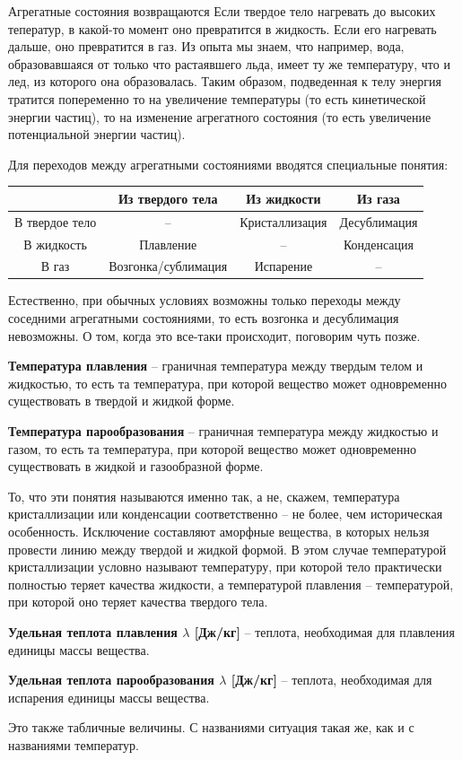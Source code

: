 \documentclass{article}
\newcommand{\definition}[2]{\begin{samepage} \textbf{#1} -- #2. \end{samepage} \par}
\begin{document}
	\begin{section}{Агрегатные состояния возвращаются}
		Если твердое тело нагревать до высоких теператур, в какой-то момент оно превратится в жидкость. Если его нагревать дальше, оно превратится в газ. Из опыта мы знаем, что например, вода, образовавшаяся от только что растаявшего льда, имеет ту же температуру, что и лед, из которого она образовалась. Таким образом, подведенная к телу энергия тратится попеременно то на увеличение температуры (то есть кинетической энергии частиц), то на изменение агрегатного состояния (то есть увеличение потенциальной энергии частиц).

		Для переходов между агрегатными состояниями вводятся специальные понятия:

		\def\arraystretch{2.5}
		\begin{tabular}{c|c|c|c}
			& Из твердого тела & Из жидкости & Из газа \\ \hline
			В твердое тело & -- & Кристаллизация & Десублимация \\
			В жидкость & Плавление & -- & Конденсация \\
			В газ & Возгонка/сублимация & Испарение & --
		\end{tabular}

		Естественно, при обычных условиях возможны только переходы между соседними агрегатными состояниями, то есть возгонка и десублимация невозможны. О том, когда это все-таки происходит, поговорим чуть позже.

		\definition{Температура плавления}{граничная температура между твердым телом и жидкостью, то есть та температура, при которой вещество может одновременно существовать в твердой и жидкой форме}

		\definition{Температура парообразования}{граничная температура между жидкостью и газом, то есть та температура, при которой вещество может одновременно существовать в жидкой и газообразной форме}

		То, что эти понятия называются именно так, а не, скажем, температура кристаллизации или конденсации соответственно -- не более, чем историческая особенность. Исключение составляют аморфные вещества, в которых нельзя провести линию между твердой и жидкой формой. В этом случае температурой кристаллизации условно называют температуру, при которой тело практически полностью теряет качества жидкости, а температурой плавления -- температурой, при которой оно теряет качества твердого тела.

		\definition{Удельная теплота плавления $\lambda$ [Дж/кг]}{теплота, необходимая для плавления единицы массы вещества}

		\definition{Удельная теплота парообразования $\lambda$ [Дж/кг]}{теплота, необходимая для испарения единицы массы вещества}

		Это также табличные величины. С названиями ситуация такая же, как и с названиями температур.
	\end{section}
\end{document}
